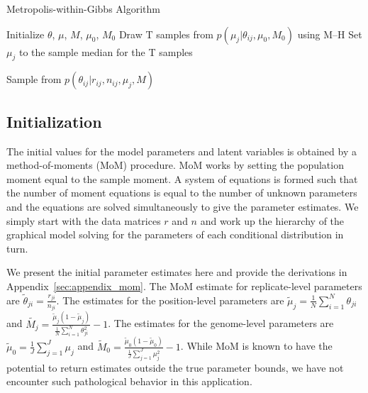 \documentclass[11pt,reqno]{amsart}
\begin{document}
\begin{algorithm}[ht]
\caption{Metropolis-within-Gibbs Algorithm}
\label{alg:metro_gibbs}
\begin{algorithmic}[1]

\State Initialize $\theta$, $\mu$, $M$, $\mu_0$, $M_0$
\Repeat
{} 
  \State Draw T samples from $p \left( \mu_j |\theta_{ij},\mu_0,M_0\right)$ using M--H
  \State Set $\mu_j$ to the sample median for the T samples
  
  
   
	\State Sample from $p \left( \theta_{ij} |r_{ij},n_{ij},\mu_j,M \right)$
  \EndFor

\EndFor
{}
\end{algorithmic}
\end{algorithm}

\subsection{Initialization}
The initial values for the model parameters and latent variables is obtained by a method-of-moments (MoM) procedure. MoM works by setting the population moment equal to the sample moment. A system of equations is formed such that the number of moment equations is equal to the number of unknown parameters and the equations are solved simultaneously to give the parameter estimates. We simply start with the data matrices $r$ and $n$ and work up the hierarchy of the graphical model solving for the parameters of each conditional distribution in turn.

We present the initial parameter estimates here and provide the derivations in Appendix~\ref{sec:appendix_mom}. The MoM estimate for replicate-level parameters are $\tilde{\theta}_{ji} = \frac{r_{ji}} {n_{ji}}$. The estimates for the position-level parameters are $\tilde{\mu}_j = \frac{1}{N} \sum_{i=1}^N \theta_{ji}$ and $\tilde{M_j} = \frac{ \tilde{\mu}_j (1 - \tilde{\mu}_j ) } { \frac{1}{N} \sum_{i=1}^N \theta_{ji}^2 } -1$. The estimates for the genome-level parameters are $\tilde{\mu}_0 = \frac{1}{J} \sum_{j=1}^J \mu_j$ and $\tilde{M}_0 = \frac{ \tilde{\mu}_0 (1 - \tilde{\mu}_0 ) } {\frac{1}{J} \sum_{j=1}^J \mu_j^2 } -1$. While MoM is known to have the potential to return estimates outside the true parameter bounds, we have not encounter such pathological behavior in this application. 

\end{document}
